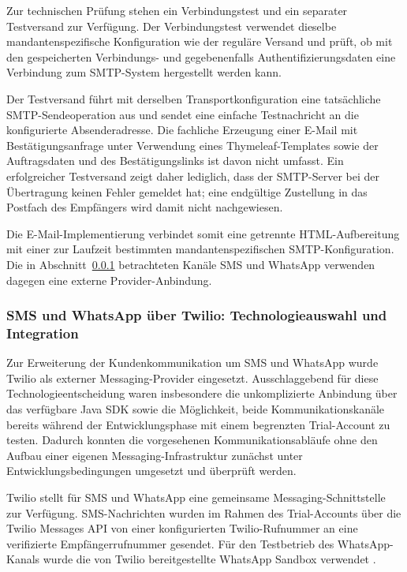 Zur technischen Prüfung stehen ein Verbindungstest und ein separater
Testversand zur Verfügung. Der Verbindungstest verwendet dieselbe
mandantenspezifische Konfiguration wie der reguläre Versand und prüft, ob mit
den gespeicherten Verbindungs- und gegebenenfalls Authentifizierungsdaten eine
Verbindung zum SMTP-System hergestellt werden kann.

Der Testversand führt mit derselben Transportkonfiguration eine tatsächliche
SMTP-Sendeoperation aus und sendet eine einfache Testnachricht an die
konfigurierte Absenderadresse. Die fachliche Erzeugung einer E-Mail mit Bestätigungsanfrage unter Verwendung
eines Thymeleaf-Templates sowie der Auftragsdaten und des Bestätigungslinks
ist davon nicht umfasst. Ein erfolgreicher Testversand zeigt
daher lediglich, dass der SMTP-Server bei der Übertragung keinen Fehler
gemeldet hat; eine endgültige Zustellung in das Postfach des Empfängers wird
damit nicht nachgewiesen.

Die E-Mail-Implementierung verbindet somit eine getrennte HTML-Aufbereitung mit
einer zur Laufzeit bestimmten mandantenspezifischen SMTP-Konfiguration. Die in
Abschnitt~\ref{sec:sms-whatsapp} betrachteten Kanäle SMS und WhatsApp verwenden
dagegen eine externe Provider-Anbindung.

\subsubsection{SMS und WhatsApp über Twilio: Technologieauswahl und Integration}
\label{sec:sms-whatsapp}

Zur Erweiterung der Kundenkommunikation um SMS und WhatsApp wurde
Twilio als externer Messaging-Provider eingesetzt. Ausschlaggebend
für diese Technologieentscheidung waren insbesondere die
unkomplizierte Anbindung über das verfügbare Java SDK sowie die
Möglichkeit, beide Kommunikationskanäle bereits während der
Entwicklungsphase mit einem begrenzten Trial-Account zu testen.
Dadurch konnten die vorgesehenen Kommunikationsabläufe ohne den
Aufbau einer eigenen Messaging-Infrastruktur zunächst unter
Entwicklungsbedingungen umgesetzt und überprüft werden.

Twilio stellt für SMS und WhatsApp eine gemeinsame
Messaging-Schnittstelle zur Verfügung. SMS-Nachrichten wurden im
Rahmen des Trial-Accounts über die Twilio Messages API von einer
konfigurierten Twilio-Rufnummer an eine verifizierte
Empfängerrufnummer gesendet. Für den Testbetrieb des
WhatsApp-Kanals wurde die von Twilio bereitgestellte WhatsApp
Sandbox verwendet \parencite{twilioMessagesResource,twilioWhatsAppSandbox}.

